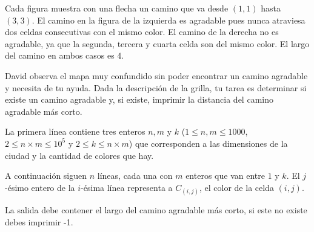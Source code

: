 \documentclass{oci}
\begin{document}
\begin{problemDescription}
\begin{figure}[!h]
\end{figure}

Cada figura muestra con una flecha un camino que va desde $(1,1)$ hasta $(3,3)$.
%
El camino en la figura de la izquierda es agradable pues nunca atraviesa dos celdas
consecutivas con el mismo color.
%
El camino de la derecha no es agradable, ya que la segunda, tercera y cuarta
celda son del mismo color.
%
El largo del camino en ambos casos es $4$.

David observa el mapa muy confundido sin poder encontrar un camino agradable y necesita de tu
ayuda.
%
Dada la descripción de la grilla, tu tarea es determinar si existe un camino agradable
y, si existe, imprimir la distancia del camino agradable más corto.

\end{problemDescription}


\begin{inputDescription}
La primera línea contiene tres enteros $n, m$ y $k$
($1 \leq n, m \leq 1000$, $2 \leq n\times m \leq 10^5$ y $2 \leq k \leq n \times m$)
que corresponden a las dimensiones de la ciudad y la cantidad de colores que hay.

A continuación siguen $n$ líneas, cada una con $m$ enteros que van entre $1$ y $k$.
%
El $j$-ésimo entero de la $i$-ésima línea representa a $C_{(i,j)}$, el color de la celda $(i,j)$.

\end{inputDescription}

\begin{outputDescription}
  La salida debe contener el largo del camino agradable más corto,
  si este no existe debes imprimir -1.

\end{outputDescription}
\end{document}
